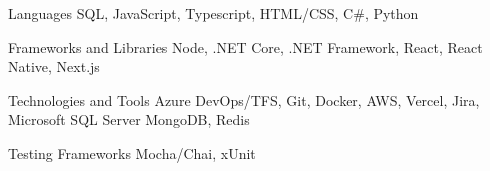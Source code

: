 

\begin{cvskills}

  \cvskill
    {Languages} %
    {SQL, JavaScript, Typescript, HTML/CSS, C\#, Python} %

  \cvskill
    {Frameworks and Libraries} %
    {Node, .NET Core, .NET Framework, React, React Native, Next.js} %

  \cvskill
    {Technologies and Tools} %
    {Azure DevOps/TFS, Git, Docker, AWS, Vercel, Jira, Microsoft SQL Server \newline MongoDB, Redis} %

  \cvskill
    {Testing Frameworks} %
    {Mocha/Chai, xUnit} %

\end{cvskills}
